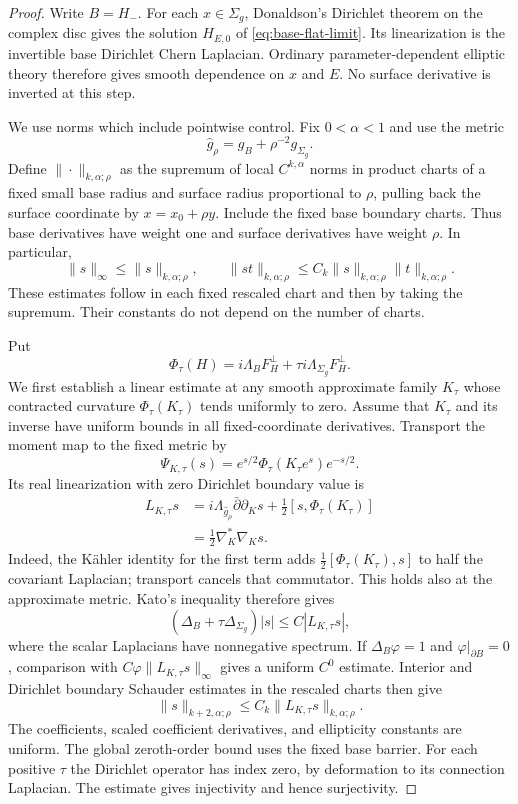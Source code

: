 \documentclass[11pt]{amsart}
\theoremstyle{definition}
\theoremstyle{remark}
\theoremstyle{plain}
\begin{document}
\begin{proof}
Write $B=H_-$. For each $x\in\Sigma_g$, Donaldson's Dirichlet theorem
on the complex disc gives the solution $H_{E,0}$ of
\eqref{eq:base-flat-limit}. Its linearization is the invertible base
Dirichlet Chern Laplacian. Ordinary parameter-dependent elliptic theory
therefore gives smooth dependence on $x$ and $E$. No surface derivative
is inverted at this step.

We use norms which include pointwise control. Fix $0<\alpha<1$ and use
the metric
\[
                    \widehat g_\rho=g_B+\rho^{-2}g_{\Sigma_g}.
\]
Define $\|\cdot\|_{k,\alpha;\rho}$ as the supremum of local
$C^{k,\alpha}$ norms in product charts of a fixed small base radius and
surface radius proportional to $\rho$, pulling back the surface
coordinate by $x=x_0+\rho y$. Include the fixed base boundary charts.
Thus base derivatives have weight one and surface derivatives have
weight $\rho$. In particular,
\[
 \|s\|_\infty\leq\|s\|_{k,\alpha;\rho},\qquad
 \|st\|_{k,\alpha;\rho}
 \leq C_k\|s\|_{k,\alpha;\rho}\|t\|_{k,\alpha;\rho}.
\]
These estimates follow in each fixed rescaled chart and then by taking
the supremum. Their constants do not depend on the number of charts.

Put
\[
 \Phi_\tau(H)=i\Lambda_BF_H^\perp+
                    \tau i\Lambda_{\Sigma_g}F_H^\perp.
\]
We first establish a linear estimate at any smooth approximate family
$K_\tau$ whose contracted curvature $\Phi_\tau(K_\tau)$ tends uniformly
to zero. Assume that $K_\tau$ and its inverse have uniform bounds in
all fixed-coordinate derivatives. Transport the moment map to the fixed
metric by
\[
 \Psi_{K,\tau}(s)=e^{s/2}\Phi_\tau(K_\tau e^s)e^{-s/2}.
\]
Its real linearization with zero Dirichlet boundary value is
\[
 \begin{split}
 L_{K,\tau}s
 &=i\Lambda_{\widehat g_\rho}\bar\partial\partial_Ks
                  +\tfrac12[s,\Phi_\tau(K_\tau)]\\
 &=\tfrac12\nabla_K^*\nabla_Ks.
 \end{split}
\]
Indeed, the K\"ahler identity for the first term adds
$\tfrac12[\Phi_\tau(K_\tau),s]$ to half the covariant Laplacian;
transport cancels that commutator. This holds also at the approximate
metric. Kato's inequality therefore gives
\[
 (\Delta_B+\tau\Delta_{\Sigma_g})|s|
 \leq C|L_{K,\tau}s|,
\]
where the scalar Laplacians have nonnegative spectrum. If
$\Delta_B\varphi=1$ and $\varphi|_{\partial B}=0$, comparison with
$C\varphi\|L_{K,\tau}s\|_\infty$ gives a uniform $C^0$ estimate.
Interior and Dirichlet boundary Schauder estimates in the rescaled charts
then give
\begin{equation}\label{eq:compact-holder-inverse}
 \|s\|_{k+2,\alpha;\rho}
 \leq C_k\|L_{K,\tau}s\|_{k,\alpha;\rho}.
\end{equation}
The coefficients, scaled coefficient derivatives, and ellipticity
constants are uniform. The global zeroth-order bound uses the fixed base
barrier. For each positive $\tau$ the Dirichlet operator has index zero,
by deformation to its connection Laplacian. The estimate gives
injectivity and hence surjectivity.


\end{proof}
\end{document}
